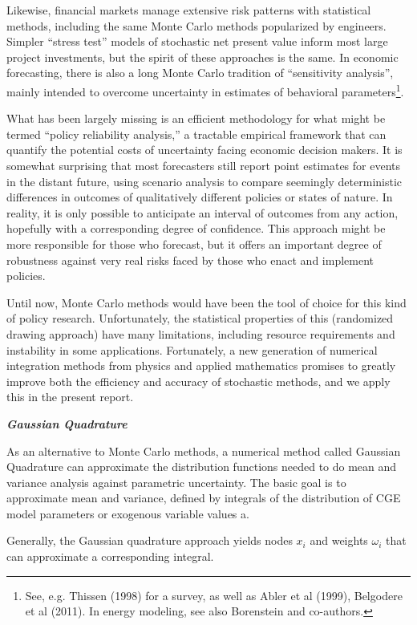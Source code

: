 \documentclass{article}
\begin{document}
Likewise, financial markets manage extensive risk patterns with statistical methods, including the same Monte Carlo methods popularized by engineers. Simpler “stress test” models of stochastic net present value inform most large project investments, but the spirit of these approaches is the same. In economic forecasting, there is also a long Monte Carlo tradition of “sensitivity analysis”, mainly intended to overcome uncertainty in estimates of behavioral parameters\footnote{ See, e.g. Thissen (1998) for a survey, as well as Abler et al (1999), Belgodere et al (2011). In energy modeling, see also Borenstein and co-authors.}.

What has been largely missing is an efficient methodology for what might be termed “policy reliability analysis,” a tractable empirical framework that can quantify the potential costs of uncertainty facing economic decision makers. It is somewhat surprising that most forecasters still report point estimates for events in the distant future, using scenario analysis to compare seemingly deterministic differences in outcomes of qualitatively different policies or states of nature. In reality, it is only possible to anticipate an interval of outcomes from any action, hopefully with a corresponding degree of confidence. This approach might be more responsible for those who forecast, but it offers an important degree of robustness against very real risks faced by those who enact and implement policies.

Until now, Monte Carlo methods would have been the tool of choice for this kind of policy research. Unfortunately, the statistical properties of this (randomized drawing approach) have many limitations, including resource requirements and instability in some applications. Fortunately, a new generation of numerical integration methods from physics and applied mathematics promises to greatly improve both the efficiency and accuracy of stochastic methods, and we apply this in the present report.

\textbf{\textit{Gaussian Quadrature}}

As an alternative to Monte Carlo methods, a numerical method called Gaussian Quadrature can approximate the distribution functions needed to do mean and variance analysis against parametric uncertainty. The basic goal is to approximate mean and variance, defined by integrals of the distribution of CGE model parameters or exogenous variable values a.

Generally, the Gaussian quadrature approach yields nodes $x_i$ and weights $\omega_i$ that can approximate a corresponding integral.
\end{document}
